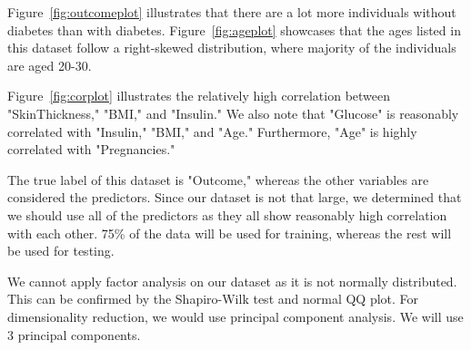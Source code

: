 \documentclass[12pt]{article}
\begin{document}
Figure~\ref{fig:outcomeplot} illustrates that there are a lot more individuals without diabetes than with diabetes. Figure~\ref{fig:ageplot} showcases that the ages listed in this dataset follow a right-skewed distribution, where majority of the individuals are aged 20-30.

Figure~\ref{fig:corplot} illustrates the relatively high correlation between "SkinThickness," "BMI," and "Insulin." We also note that "Glucose" is reasonably correlated with "Insulin," "BMI," and "Age." Furthermore, "Age" is highly correlated with "Pregnancies."

The true label of this dataset is "Outcome," whereas the other variables are considered the predictors. Since our dataset is not that large, we determined that we should use all of the predictors as they all show reasonably high correlation with each other. 75\% of the data will be used for training, whereas the rest will be used for testing.

We cannot apply factor analysis on our dataset as it is not normally distributed. This can be confirmed by the Shapiro-Wilk test and normal QQ plot. For dimensionality reduction, we would use principal component analysis. We will use 3 principal components.
\end{document}
